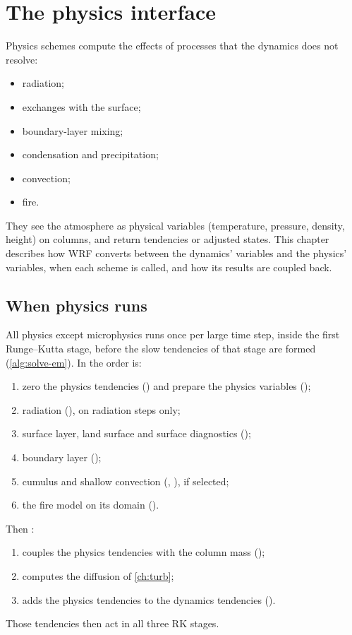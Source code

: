 \chapter{The physics interface}\label{ch:phys}

Physics schemes compute the effects of processes that the dynamics does not resolve:
\begin{itemize}
  \item radiation;
  \item exchanges with the surface;
  \item boundary-layer mixing;
  \item condensation and precipitation;
  \item convection;
  \item fire.
\end{itemize}
They see the atmosphere as physical variables (temperature, pressure, density, height) on columns, and return tendencies
or adjusted states. This chapter describes how WRF converts between the dynamics' variables and the physics'
variables, when each scheme is called, and how its results are coupled back.

\section{When physics runs}

All physics except microphysics runs once per large time step, inside the first Runge--Kutta stage, before the slow
tendencies of that stage are formed (\cref{alg:solve-em}). In 
the order is:
\begin{enumerate}
  \item zero the physics tendencies () and prepare the physics variables ();
  \item radiation (), on radiation steps only;
  \item surface layer, land surface and surface diagnostics ();
  \item boundary layer ();
  \item cumulus and shallow convection (, ), if selected;
  \item the fire model on its domain ().
\end{enumerate}
Then :
\begin{enumerate}
  \item couples the physics tendencies with the column mass ();
  \item computes the diffusion of \cref{ch:turb};
  \item adds the physics tendencies to the dynamics tendencies ().
\end{enumerate}
Those tendencies then act in all three RK stages.

